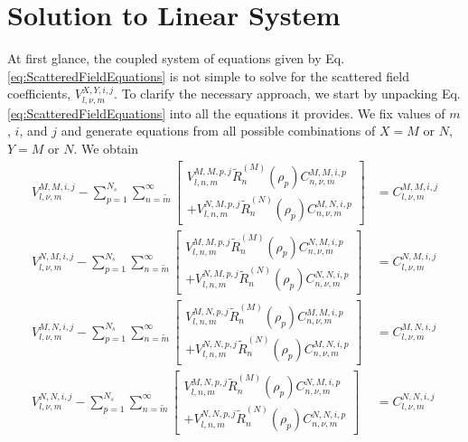 \chapter[Solution to Linear System][Solution to Linear System]{Solution to Linear System} \label{ap:SolutionToLinearSystem}
%
At first glance, the coupled system of equations given by Eq. \ref{eq:ScatteredFieldEquations} is not simple to solve for the scattered field coefficients, $V_{l, \nu, m}^{X,Y,i,j}$. To clarify the necessary approach, we start by unpacking Eq. \ref{eq:ScatteredFieldEquations} into all the equations it provides. We fix values of $m$, $i$, and $j$ and generate equations from all possible combinations of $X=M$ or $N$, $Y = M$ or $N$. We obtain
%
\begin{subequations}
\begin{align}
V_{l, \nu, m}^{M,M,i,j}
- \sum_{p=1}^{N_{s}} \sum_{n = \widetilde{m}}^{\infty}
\left[ \begin{array}{r}
V_{l,n,m}^{M,M,p,j} \widetilde{R}_{n}^{(M)}(\rho_{p}) C_{n,\nu,m}^{M,M,i,p}
\\
+ V_{l,n,m}^{N,M,p,j} \widetilde{R}_{n}^{(N)}(\rho_{p}) C_{n,\nu,m}^{M,N,i,p}
\end{array} \right]
&= C_{l, \nu, m}^{M,M,i,j}
\\
V_{l, \nu, m}^{N,M,i,j}
- \sum_{p=1}^{N_{s}} \sum_{n = \widetilde{m}}^{\infty}
\left[ \begin{array}{r}
V_{l,n,m}^{M,M,p,j} \widetilde{R}_{n}^{(M)}(\rho_{p}) C_{n,\nu,m}^{N,M,i,p}
\\
+ V_{l,n,m}^{N,M,p,j} \widetilde{R}_{n}^{(N)}(\rho_{p}) C_{n,\nu,m}^{N,N,i,p}
\end{array} \right]
&= C_{l, \nu, m}^{N,M,i,j}
\\
V_{l, \nu, m}^{M,N,i,j}
- \sum_{p=1}^{N_{s}} \sum_{n = \widetilde{m}}^{\infty}
\left[ \begin{array}{r}
V_{l,n,m}^{M,N,p,j} \widetilde{R}_{n}^{(M)}(\rho_{p}) C_{n,\nu,m}^{M,M,i,p}
\\
+ V_{l,n,m}^{N,N,p,j} \widetilde{R}_{n}^{(N)}(\rho_{p}) C_{n,\nu,m}^{M,N,i,p}
\end{array} \right]
& = C_{l, \nu, m}^{M,N,i,j}
\\
V_{l, \nu, m}^{N,N,i,j}
- \sum_{p=1}^{N_{s}} \sum_{n = \widetilde{m}}^{\infty}
\left[ \begin{array}{r}
V_{l,n,m}^{M,N,p,j} \widetilde{R}_{n}^{(M)}(\rho_{p}) C_{n,\nu,m}^{N,M,i,p}
\\
+ V_{l,n,m}^{N,N,p,j} \widetilde{R}_{n}^{(N)}(\rho_{p}) C_{n,\nu,m}^{N,N,i,p}
\end{array} \right]
& = C_{l, \nu, m}^{N,N,i,j}
\end{align}
\end{subequations}

